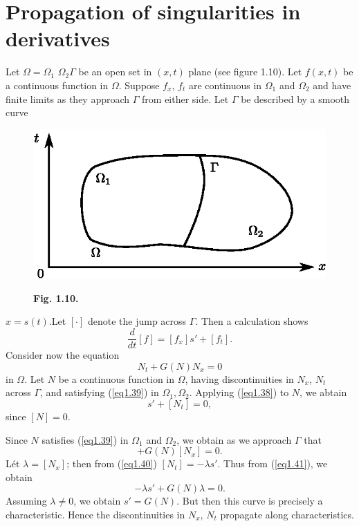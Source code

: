 \section{Propagation of singularities in derivatives}\label{chap1:sec1.6}
Let $\Omega = \Omega_1$ $\Omega_2 \Gamma$  be an open set in $(x,t)$ plane (see figure 1.10). Let $f(x,t)$ be a continuous function in $\Omega$. Suppose $f_x$, $f_t$ are continuous in $\Omega_1$ and $\Omega_2$ and have finite limits as they approach $\Gamma$ from either side. Let $\Gamma$ be described by a smooth curve

\begin{figure}[H]
\centering
\includegraphics{figures/fig1.10.eps}
\centerline{\bf Fig. 1.10.}
\end{figure}
$x= s (t)$.\pageoriginale Let $[\cdot ]$ denote the jump across $\Gamma$. Then a calculation shows 
\begin{equation*}
\frac{d}{dt} [f] = [f_x] s' + [f_t]. \tag{1.38}\label{eq1.38}
\end{equation*}
Consider now the equation 
\begin{equation*}
N_t + G(N) N_x = 0\tag{1.39}\label{eq1.39}
\end{equation*}
in $\Omega$. Let $N$ be a continuous function in $\Omega$, having discontinuities in $N_x$, $N_t$ across $\Gamma$, and satisfying (\ref{eq1.39}) in $\Omega_1, \Omega_2$. Applying (\ref{eq1.38}) to $N$, we abtain
\begin{equation*}
[N_x] s' + [N_t] = 0, \tag{1.40}\label{eq1.40}
\end{equation*}
since $[N] =0$. 

Since $N$ satisfies (\ref{eq1.39}) in $\Omega_1$ and $\Omega_2$, we obtain as we approach $\Gamma$ that 
\begin{equation*}
[N_t] + G(N) [N_x] = 0. 
\tag{1.41}\label{eq1.41}
\end{equation*}
L\'et $\lambda = [N_x]$; then from (\ref{eq1.40}) $[N_t] = - \lambda s'$. Thus from (\ref{eq1.41}), we obtain 
$$
-\lambda s' + G(N) \lambda = 0.
$$
Assuming $\lambda \neq 0$, we obtain $s' = G(N)$. But then this curve is precisely a characteristic. Hence the discontinuities in $N_x$, $N_t$ propagate along characteristics. 


